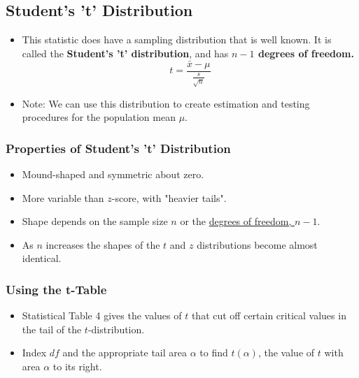 \documentclass[12pt, letterpaper]{article}
\begin{document}
        \subsection{Student's 't' Distribution}
            \begin{itemize}
                \item This statistic does have a sampling distribution that is well known. It is called the \textbf{Student's 't' distribution}, and has \textbf{$n-1$ degrees of freedom.}
                \begin{equation*}
                    t = \frac{\bar{x}-\mu}{\frac{s}{\sqrt{n}}}
                \end{equation*}
                \item Note: We can use this distribution to create estimation and testing procedures for the population mean $\mu$.
            \end{itemize}
            \subsubsection{Properties of Student's 't' Distribution}
                \begin{itemize}
                    \item Mound-shaped and symmetric about zero.
                    \item More variable than $z$-score, with "heavier tails".
                    \item Shape depends on the sample size $n$ or the \underline{degrees of freedom, $n-1$}.
                    \item As $n$ increases the shapes of the $t$ and $z$ distributions become almost identical.
                \end{itemize}
            \subsubsection*{Using the t-Table}
                \begin{itemize}
                    \item Statistical Table 4 gives the values of $t$ that cut off certain critical values in the tail of the $t$-distribution.
                    \item Index $df$ and the appropriate tail area $\alpha$ to find $t(\alpha)$, the value of $t$ with area $\alpha$ to its right.
                \end{itemize}
\end{document}
